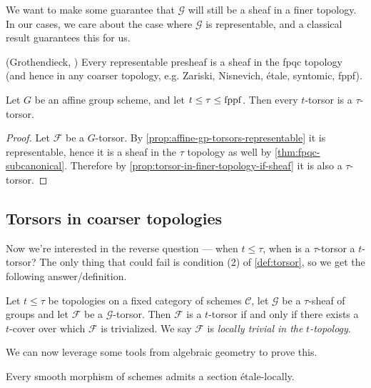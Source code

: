 \documentclass[11pt]{amsart}
\begin{document}
We want to make some guarantee that $\mathcal{G}$ will still be a sheaf in a finer topology. In our cases, we care about the case where $\mathcal{G}$ is representable, and a classical result guarantees this for us.

\begin{theorem}\label{thm:fpqc-subcanonical} 
(Grothendieck, \cite[023Q]{Stacks}) Every representable presheaf is a sheaf in the fpqc topology (and hence in any coarser topology, e.g. Zariski, Nisnevich, \'etale, syntomic, fppf).
\end{theorem}

\begin{corollary} Let $G$ be an affine group scheme, and let $t \le \tau \le \mathrm{fppf}$. Then every $t$-torsor is a $\tau$-torsor.
\end{corollary}
\begin{proof} Let $\mathcal{F}$ be a $G$-torsor. By \autoref{prop:affine-gp-torsors-representable} it is representable, hence it is a sheaf in the $\tau$ topology as well by \autoref{thm:fpqc-subcanonical}. Therefore by \autoref{prop:torsor-in-finer-topology-if-sheaf} it is also a $\tau$-torsor.
\end{proof}

\subsection{Torsors in coarser topologies}

Now we're interested in the reverse question --- when $t\le \tau$, when is a $\tau$-torsor a $t$-torsor? The only thing that could fail is condition (2) of \autoref{def:torsor}, so we get the following answer/definition.


\begin{definition} Let $t\le \tau$ be topologies on a fixed category of schemes $\mathscr{C}$, let $\mathcal{G}$ be a $\tau$-sheaf of groups and let $\mathcal{F}$ be a $\mathcal{G}$-torsor. Then $\mathcal{F}$ is a $t$-torsor if and only if there exists a $t$-cover over which $\mathcal{F}$ is trivialized. We say $\mathcal{F}$ is \textit{locally trivial in the} $t$\textit{-topology}.
\end{definition}

We can now leverage some tools from algebraic geometry to prove this.

\begin{proposition} Every smooth morphism of schemes admits a section \'etale-locally.
\end{proposition}
\end{document}
